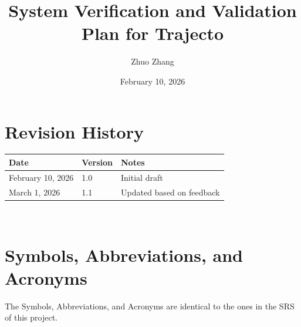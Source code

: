 \documentclass[12pt, titlepage]{article}
\providecommand{\wss}[1]{}
\providecommand{\progname}[1]{#1}
\begin{document}
\title{System Verification and Validation Plan for \progname{Trajecto}} 
\author{Zhuo Zhang}
\date{February 10, 2026}
	
\maketitle


\section*{Revision History}

\begin{tabularx}{\textwidth}{p{3cm}p{2cm}X}
\toprule {\bf Date} & {\bf Version} & {\bf Notes}\\
\midrule
February 10, 2026 & 1.0 & Initial draft\\
March 1, 2026 & 1.1 & Updated based on feedback\\
\bottomrule
\end{tabularx}

~\\
\wss{The intention of the VnV plan is to increase confidence in the software.
However, this does not mean listing every verification and validation technique
that has ever been devised.  The VnV plan should also be a \textbf{feasible}
plan. Execution of the plan should be possible with the time and team available.
If the full plan cannot be completed during the time available, it can either be
modified to ``fake it'', or a better solution is to add a section describing
what work has been completed and what work is still planned for the future.}

\wss{The VnV plan is typically started after the requirements stage, but before
the design stage.  This means that the sections related to unit testing cannot
initially be completed.  The sections will be filled in after the design stage
is complete.  the final version of the VnV plan should have all sections filled
in.}

\newpage

\tableofcontents



\newpage

\section{Symbols, Abbreviations, and Acronyms}
The Symbols, Abbreviations, and Acronyms are identical to the ones in the SRS of this project.
\end{document}
